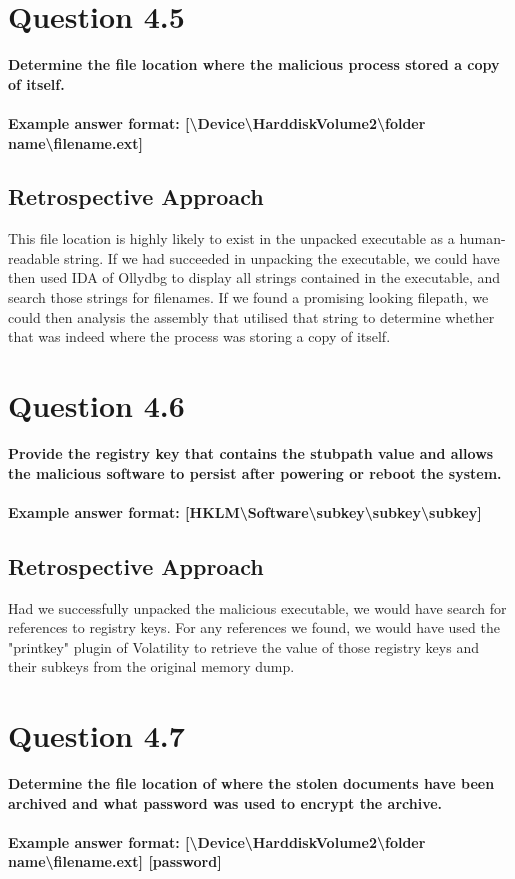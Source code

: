 \section{Question 4.5}
\textbf{Determine the file location where the malicious process stored a copy of
itself.
\\\\
Example answer format:
[\textbackslash{}Device\textbackslash{}HarddiskVolume2\textbackslash{}folder
name\textbackslash{}filename.ext]}
\subsection{Retrospective Approach}
This file location is highly likely to exist in the unpacked executable as a human-readable string. If we had succeeded in unpacking the executable, we could have then used IDA of Ollydbg to display all strings contained in the executable, and search those strings for filenames. If we found a promising looking filepath, we could then analysis the assembly that utilised that string to determine whether that was indeed where the process was storing a copy of itself. 
\section{Question 4.6}
\textbf{Provide the registry key that contains the stubpath value and allows the
malicious software to persist after powering or reboot the system.
\\\\
Example answer format:
[HKLM\textbackslash{}Software\textbackslash{}subkey\textbackslash{}subkey\textbackslash{}subkey]}
\subsection{Retrospective Approach}
Had we successfully unpacked the malicious executable, we would have search for references to registry keys. For any references we found, we would have used the "printkey" plugin of Volatility to retrieve the value of those registry keys and their subkeys from the original memory dump.
\section{Question 4.7}
\textbf{Determine the file location of where the stolen documents have been
archived and what password was used to encrypt the archive.
\\\\
Example answer format:
[\textbackslash{}Device\textbackslash{}HarddiskVolume2\textbackslash{}folder
name\textbackslash{}filename.ext] [password]}
